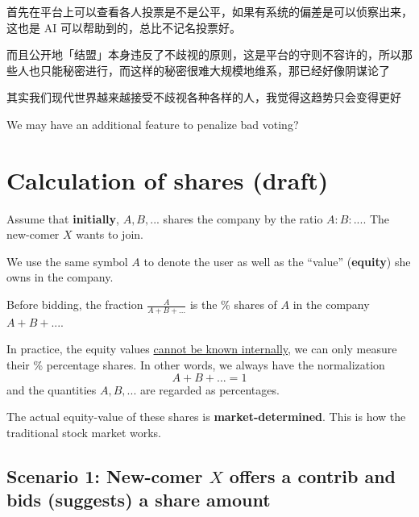 \documentclass[12pt, orivec]{article}
\newcommand{\cc}[2]{#1}
\newcommand{\cc}[2]{#2}
\begin{document}
\cc{
首先在平台上可以查看各人投票是不是公平，如果有系统的偏差是可以侦察出来，这也是 AI 可以帮助到的，总比不记名投票好。}{
On our platform, we can examine every vote to see if they are fair.  If there is systematic bias it can be detected by people or AI algorithms.  This is definitely an improvement over secret ballot.
}

\cc{
而且公开地「结盟」本身违反了不歧视的原则，这是平台的守则不容许的，所以那些人也只能秘密进行，而这样的秘密很难大规模地维系，那已经好像阴谋论了}{
It is clearly against Coco's policy to form off-platform ``alliances'' to try to influence voting.  Such collusions can only be conducted in secret and would be hard to maintain for large numbers of people.  
}

\cc{
其实我们现代世界越来越接受不歧视各种各样的人，我觉得这趋势只会变得更好}{
	
}

We may have an additional feature to penalize bad voting?

\secttoc
\section{Calculation of shares (draft)}

Assume that \textbf{initially}, $A, B, ...$ shares the company by the ratio $A : B : ...$.  The new-comer $X$ wants to join.

We use the same symbol $A$ to denote the user as well as the ``value'' (\textbf{equity}) she owns in the company.  

Before bidding, the fraction $\frac{A}{A + B + ...}$ is the \% shares of $A$ in the company $A + B + ...$.

In practice, the equity values \uline{cannot be known internally}, we can only measure their \% percentage shares.  In other words, we always have the normalization
\begin{equation}
A + B + ... = 1
\end{equation}
and the quantities $A, B, ...$ are regarded as percentages.

The actual equity-value of these shares is \textbf{market-determined}.  This is how the traditional stock market works.

\secttoc
\subsection{Scenario 1:  New-comer $X$ offers a contrib and bids (suggests) a share amount}
\end{document}

